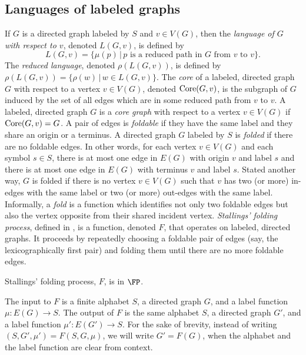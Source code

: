 \documentclass{article}
\newcommand{\Core}{\textnormal{Core}}
\begin{document}
\subsection{Languages of labeled graphs}

If $G$ is a directed graph labeled by $S$ and $v \in V(G)$, then the \emph{language of $G$ with respect to $v$}, denoted $L(G, v)$, is defined by
\begin{equation*}
  L(G, v) = \{ \mu(p) \, | \, p \text{ is a reduced path in } G \text{ from } v \text{ to } v\}.
\end{equation*}
The \emph{reduced language}, denoted $\rho(L(G, v))$, is defined by $\rho(L(G, v)) = \{ \rho(w) \, | \, w \in L(G, v) \}$.
The \emph{core} of a labeled, directed graph $G$ with respect to a vertex $v \in V(G)$, denoted $\Core(G, v)$, is the subgraph of $G$ induced by the set of all edges which are in some reduced path from $v$ to $v$.
A labeled, directed graph $G$ is a \emph{core graph} with respect to a vertex $v \in V(G)$ if $\Core(G, v) = G$.
A pair of edges is \emph{foldable} if they have the same label and they share an origin or a terminus.
A directed graph $G$ labeled by $S$ is \emph{folded} if there are no foldable edges.
In other words, for each vertex $v \in V(G)$ and each symbol $s \in S$, there is at most one edge in $E(G)$ with origin $v$ and label $s$ and there is at most one edge in $E(G)$ with terminus $v$ and label $s$.
Stated another way, $G$ is folded if there is no vertex $v \in V(G)$ such that $v$ has two (or more) in-edges with the same label or two (or more) out-edges with the same label.
Informally, a \emph{fold} is a function which identifies not only two foldable edges but also the vertex opposite from their shared incident vertex.
\emph{Stallings' folding process}, defined in \autocite[Algorithm~5.4]{stallings83}, is a function, denoted $F$, that operates on labeled, directed graphs.
It proceeds by repeatedly choosing a foldable pair of edges (say, the lexicographically first pair) and folding them until there are no more foldable edges.
\begin{theorem}\label{thm:finfp}
  Stallings' folding process, $F$, is in $\FP$.
\end{theorem}

The input to $F$ is a finite alphabet $S$, a directed graph $G$, and a label function $\mu \colon E(G) \to S$.
The output of $F$ is the same alphabet $S$, a directed graph $G'$, and a label function $\mu' \colon E(G') \to S$.
For the sake of brevity, instead of writing $(S, G', \mu') = F(S, G, \mu)$, we will write $G' = F(G)$, when the alphabet and the label function are clear from context.
\end{document}
